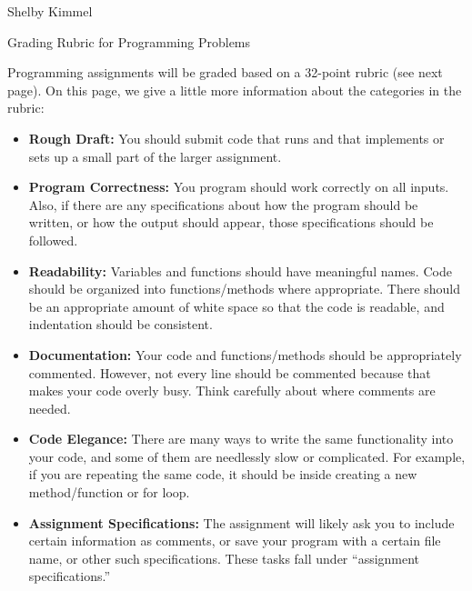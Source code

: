 \documentclass[11pt,landscape]{article}
\begin{document}
\hfill Shelby Kimmel

\begin{center}
{\huge Grading Rubric for Programming Problems}
\end{center}
\bigskip

Programming assignments will be graded based on a 32-point rubric (see next page). On this page, we give a little more information about the categories in the rubric:

\begin{itemize}
\item \textbf{Rough Draft:} You should submit code that runs and that implements or sets up a small part of the larger assignment.

\item \textbf{Program Correctness:} You program should work correctly on all inputs. Also, if there are any specifications about how the program should be written, or how the output should appear, those specifications should be followed.

\item \textbf{Readability:} Variables and functions should have meaningful names. Code should be organized into functions/methods where appropriate. There should be an appropriate amount of white space so that the code is readable, and indentation should be consistent.

\item \textbf{Documentation:} Your code and functions/methods should be appropriately commented. However, not every line should be commented because that makes your code overly busy. Think carefully about where comments are needed. 

\item \textbf{Code Elegance:} There are many ways to write the same functionality into your code, and some of them are needlessly slow or complicated. For example, if you are repeating the same code, it should be inside  creating a new method/function or for loop.

\item \textbf{Assignment Specifications:} The assignment will likely ask you to include certain information as comments, or save your program with a certain file name, or other such specifications. These tasks fall under ``assignment specifications.''
\end{itemize}
\end{document}
